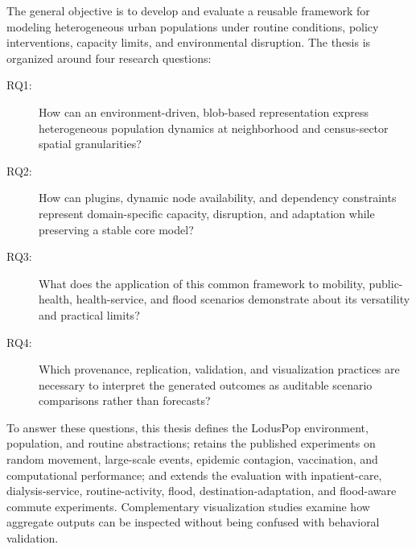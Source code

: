 \documentclass[pdflatex,sn-mathphys-num]{sn-jnl}%
\theoremstyle{thmstyleone}%
\theoremstyle{thmstyletwo}%
\theoremstyle{thmstylethree}%
\begin{document}
The general objective is to develop and evaluate a reusable framework for modeling heterogeneous urban populations under routine conditions, policy interventions, capacity limits, and environmental disruption. The thesis is organized around four research questions:

\begin{description}
    \item[RQ1:] How can an environment-driven, blob-based representation express heterogeneous population dynamics at neighborhood and census-sector spatial granularities?
    \item[RQ2:] How can plugins, dynamic node availability, and dependency constraints represent domain-specific capacity, disruption, and adaptation while preserving a stable core model?
    \item[RQ3:] What does the application of this common framework to mobility, public-health, health-service, and flood scenarios demonstrate about its versatility and practical limits?
    \item[RQ4:] Which provenance, replication, validation, and visualization practices are necessary to interpret the generated outcomes as auditable scenario comparisons rather than forecasts?
\end{description}

To answer these questions, this thesis defines the LodusPop environment, population, and routine abstractions; retains the published experiments on random movement, large-scale events, epidemic contagion, vaccination, and computational performance; and extends the evaluation with inpatient-care, dialysis-service, routine-activity, flood, destination-adaptation, and flood-aware commute experiments. Complementary visualization studies examine how aggregate outputs can be inspected without being confused with behavioral validation.

\end{document}

